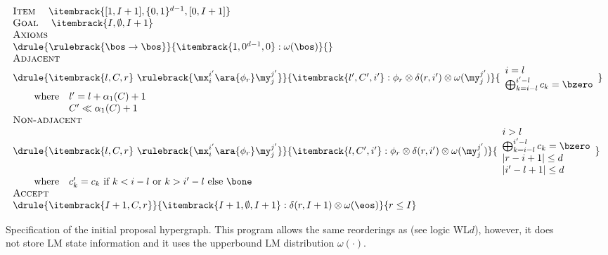 \begin{figure}[t]
\small
\begin{center}
\[ \left. 
  \begin{array}{l}
    \textsc{Item} ~~~~ {\itembrack{[1, I+1], \{0, 1\}^{d-1}, [0, I+1]}} \\
    \textsc{Goal} ~~~~ {\itembrack{I,\emptyset, I+1}} \\
    \textsc{Axioms} \\ 
	\drule{\rulebrack{\bos \rightarrow \bos}}{\itembrack{1, 0^{d-1}, 0}:\omega(\bos)}{} \\
    \textsc{Adjacent} \\
	\drule{\itembrack{l, C, r} ~ \rulebrack{\mx_i^{i'} \ara{\phi_r} \my_j^{j'}}}{\itembrack{l',C', i'}:\phi_r\otimes\delta(r, i')\otimes \omega(\my_j^{j'})}{\wldadjside} \\ 
    ~~~~~ \wldadjcons \\
    \textsc{Non-adjacent} \\
	\drule{\itembrack{l, C, r} ~ \rulebrack{\mx_i^{i'} \ara{\phi_r} \my_j^{j'}}}{\itembrack{l,C',i'}:\phi_r\otimes\delta(r, i')\otimes \omega(\my_j^{j'})}{\wldnadjside} \\ 
    ~~~~~ \wldnadjcons \\
    \textsc{Accept} \\
	\drule{\itembrack{I+1, C, r}}{\itembrack{I+1,\emptyset,I+1}:\delta(r, I+1)\otimes \omega(\eos)}{r \leq I} \\ 

  \end{array} 
\right.\]
\end{center}
\caption{Specification of the initial proposal hypergraph. This program allows the same reorderings as \cite{Lopez:2009:TWD} (see logic WL$d$), however, it does not store \acs{LM} state information and it uses the upperbound LM distribution $\omega(\cdot)$.}\label{fig:q0}
\end{figure}

